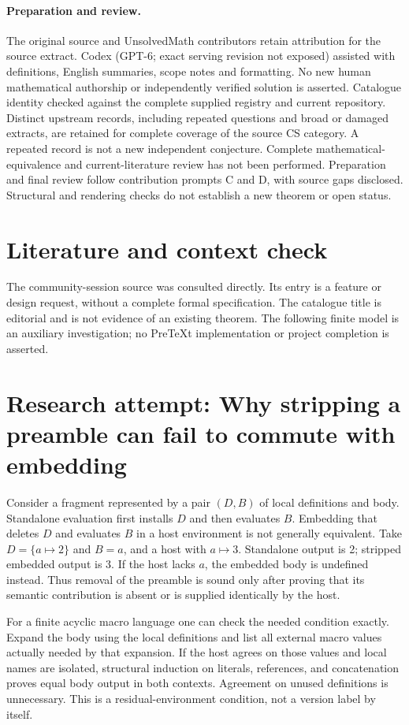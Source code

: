 \documentclass[11pt]{article}
\begin{document}
\paragraph{Preparation and review.}
The original source and UnsolvedMath contributors retain attribution for the source extract. Codex (GPT-6; exact serving revision not exposed) assisted with definitions, English summaries, scope notes and formatting. No new human mathematical authorship or independently verified solution is asserted. Catalogue identity checked against the complete supplied registry and current repository. Distinct upstream records, including repeated questions and broad or damaged extracts, are retained for complete coverage of the source CS category. A repeated record is not a new independent conjecture. Complete mathematical-equivalence and current-literature review has not been performed. Preparation and final review follow contribution prompts C and D, with source gaps disclosed. Structural and rendering checks do not establish a new theorem or open status.
\label{end:statement}

\section{Literature and context check}
The community-session source was consulted directly. Its entry is a feature or design request, without a complete formal specification. The catalogue title is editorial and is not evidence of an existing theorem. The following finite model is an auxiliary investigation; no PreTeXt implementation or project completion is asserted.
\section{Research attempt: Why stripping a preamble can fail to commute with embedding}
Consider a fragment represented by a pair $(D,B)$ of local definitions and body. Standalone evaluation first installs $D$ and then evaluates $B$. Embedding that deletes $D$ and evaluates $B$ in a host environment is not generally equivalent. Take $D=\{a\mapsto2\}$ and $B=a$, and a host with $a\mapsto3$. Standalone output is 2; stripped embedded output is 3. If the host lacks $a$, the embedded body is undefined instead. Thus removal of the preamble is sound only after proving that its semantic contribution is absent or is supplied identically by the host.

For a finite acyclic macro language one can check the needed condition exactly. Expand the body using the local definitions and list all external macro values actually needed by that expansion. If the host agrees on those values and local names are isolated, structural induction on literals, references, and concatenation proves equal body output in both contexts. Agreement on unused definitions is unnecessary. This is a residual-environment condition, not a version label by itself.
\end{document}
